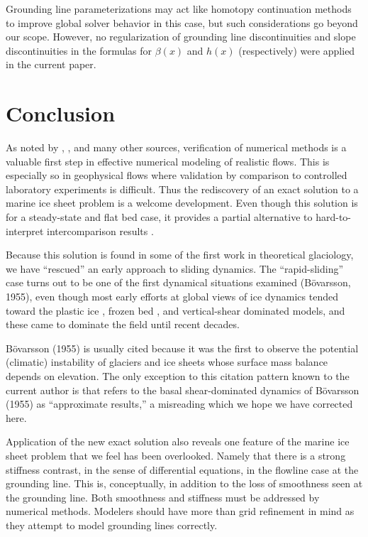 \documentclass[review,letterpaper]{igs}
\renewcommand{\dh}{\fontencoding{T1}\selectfont{\symbol{240}}}
\newcommand{\citebod}{B\"o\dh varsson (1955)\nocite{Bodvardsson}\xspace}
\newcommand{\citepbod}{(B\"o\dh varsson, 1955)\nocite{Bodvardsson}\xspace}
\begin{document}
Grounding line parameterizations \citep[e.g.][]{Gladstoneetal2010,Feldmannetal2014} may act like homotopy continuation methods \citep{Kelley} to improve global solver behavior in this case, but such considerations go beyond our scope.  However, no regularization of grounding line discontinuities and slope discontinuities in the formulas for $\beta(x)$ and $h(x)$ (respectively) were applied in the current paper.  


\section{Conclusion}  As noted by \cite{BLKCB}, \cite{Wesseling}, and many other sources, verification of numerical methods is a valuable first step in effective numerical modeling of realistic flows.  This is especially so in geophysical flows where validation by comparison to controlled laboratory experiments is difficult.  Thus the rediscovery of an exact solution to a marine ice sheet problem is a welcome development.  Even though this solution is for a steady-state and flat bed case, it provides a partial alternative to hard-to-interpret intercomparison results \citep{MISMIP2012}.

Because this solution is found in some of the first work in theoretical glaciology, we have ``rescued'' an early approach to sliding dynamics.  The ``rapid-sliding'' case turns out to be one of the first dynamical situations examined \citepbod, even though most early efforts at global views of ice dynamics tended toward the plastic ice \citep{Orowan,Nye52plastic}, frozen bed \citep{Vialov}, and vertical-shear dominated \citep{Weertman61stability} models, and these came to dominate the field until recent decades.

\citebod is usually cited because it was the first to observe the potential (climatic) instability of glaciers and ice sheets whose surface mass balance depends on elevation.  The only exception to this citation pattern known to the current author is that \cite{Fowler1992} refers to the basal shear-dominated dynamics of \citebod as ``approximate results,'' a misreading which we hope we have corrected here.

Application of the new exact solution also reveals one feature of the marine ice sheet problem that we feel has been overlooked.  Namely that there is a strong stiffness contrast, in the sense of differential equations, in the flowline case at the grounding line.  This is, conceptually, in addition to the loss of smoothness seen at the grounding line.  Both smoothness and stiffness must be addressed by numerical methods.  Modelers should have more than grid refinement in mind as they attempt to model grounding lines correctly.
\end{document}
